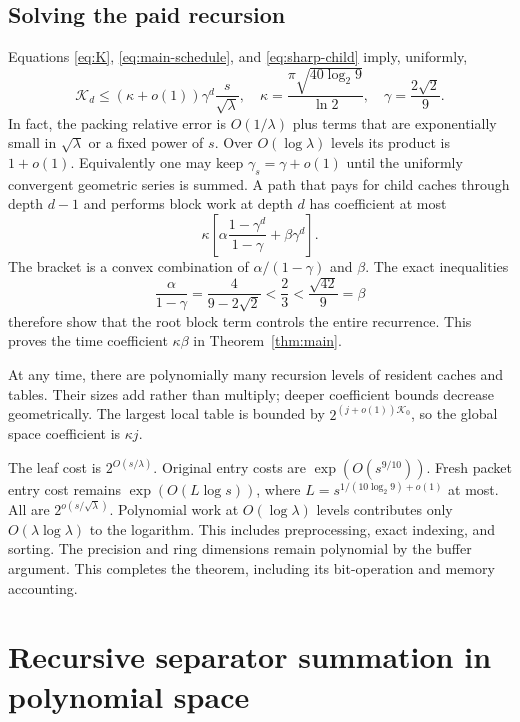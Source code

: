 \documentclass[11pt]{article}
\theoremstyle{definition}\newtheorem{definition}[theorem]{Definition}
\theoremstyle{remark}\newtheorem{remark}[theorem]{Remark}
\newcommand{\K}{\mathcal K}
\begin{document}
\subsection{Solving the paid recursion}

Equations \eqref{eq:K}, \eqref{eq:main-schedule}, and
\eqref{eq:sharp-child} imply, uniformly,
\begin{equation}
 \K_d\le(\kappa+o(1))\gamma^d\frac{s}{\sqrt\lambda},\quad
 \kappa=\frac{\pi\sqrt{40\log_2 9}}{\ln2},\quad
 \gamma=\frac{2\sqrt2}{9}.\label{eq:decay}
\end{equation}
In fact, the packing relative error is $O(1/\lambda)$ plus terms that are
exponentially small in $\sqrt\lambda$ or a fixed power of $s$. Over
$O(\log\lambda)$ levels its product is $1+o(1)$. Equivalently one may keep
$\gamma_s=\gamma+o(1)$ until the uniformly convergent geometric series is
summed. A path that pays for child caches through
depth $d-1$ and performs block work at depth $d$ has coefficient at most
\[
 \kappa\left[\alpha\frac{1-\gamma^d}{1-\gamma}
                   +\beta\gamma^d\right].
\]
The bracket is a convex combination of $\alpha/(1-\gamma)$ and $\beta$.
The exact inequalities
\begin{equation}
 \frac{\alpha}{1-\gamma}
 =\frac4{9-2\sqrt2}<\frac23<\frac{\sqrt{42}}9=\beta
 \label{eq:dominance}
\end{equation}
therefore show that the root block term controls the entire recurrence.
This proves the time coefficient $\kappa\beta$ in
Theorem~\ref{thm:main}.

At any time, there are polynomially many recursion levels of resident caches
and tables. Their sizes add rather than multiply; deeper coefficient bounds
decrease geometrically. The largest local table is bounded by
$2^{(j+o(1))\K_0}$, so the global space coefficient is $\kappa j$.

The leaf cost is $2^{O(s/\lambda)}$. Original entry costs are
$\exp(O(s^{9/10}))$. Fresh packet entry cost remains
$\exp(O(L\log s))$, where $L=s^{1/(10\log_2 9)+o(1)}$ at most.
All are $2^{o(s/\sqrt\lambda)}$. Polynomial work at
$O(\log\lambda)$ levels contributes only $O(\lambda\log\lambda)$ to
the logarithm. This includes preprocessing, exact indexing, and sorting.
The precision and ring dimensions remain polynomial by the buffer argument.
This completes the theorem, including its bit-operation and memory accounting.

\section{Recursive separator summation in polynomial space}
\label{sec:polyspace}
\end{document}
